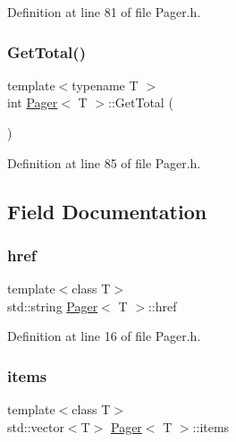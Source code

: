 Definition at line 81 of file Pager.\+h.

\mbox{\label{class_pager_adee5e1fbcf56e1a98b486b57cbe00f74}} 
\subsubsection{\texorpdfstring{Get\+Total()}{GetTotal()}}
{\footnotesize\ttfamily template$<$typename T $>$ \\
int \mbox{\hyperlink{class_pager}{Pager}}$<$ T $>$\+::Get\+Total (\begin{DoxyParamCaption}{ }\end{DoxyParamCaption})}



Definition at line 85 of file Pager.\+h.



\subsection{Field Documentation}
\mbox{\label{class_pager_ab50b06321306f4a68f83620c4429bfbf}} 
\subsubsection{\texorpdfstring{href}{href}}
{\footnotesize\ttfamily template$<$class T$>$ \\
std\+::string \mbox{\hyperlink{class_pager}{Pager}}$<$ T $>$\+::href\hspace{0.3cm}{\ttfamily [private]}}



Definition at line 16 of file Pager.\+h.

\mbox{\label{class_pager_a82bffcbf9375672986431dd661104a66}} 
\subsubsection{\texorpdfstring{items}{items}}
{\footnotesize\ttfamily template$<$class T$>$ \\
std\+::vector$<$T$>$ \mbox{\hyperlink{class_pager}{Pager}}$<$ T $>$\+::items\hspace{0.3cm}{\ttfamily [private]}}



